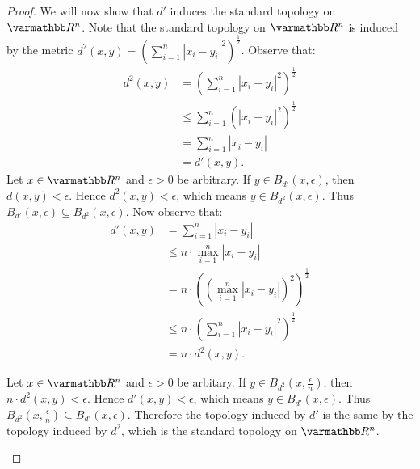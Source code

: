 \documentclass[12pt,twoside,openany]{memoir}
\begin{document}
{\begin{proof}
        We will now show that $d'$ induces the standard topology on $\bfR^n$. Note that the standard topology on $\bfR^n$ is induced by the metric $d^2(x,y) = \left(\sum_{i = 1}^n |x_i - y_i|^2\right)^\frac{1}{2}$. Observe that:
            \begin{equation*}
            \begin{split}
                d^2(x,y) 
                & = \left(\sum_{i = 1}^n |x_i - y_i|^2\right)^\frac{1}{2} \\
                & \leq \sum_{i = 1}^n \left( |x_i - y_i|^2 \right)^\frac{1}{2} \\
                & = \sum_{i = 1}^n |x_i - y_i| \\
                & = d'(x,y).
            \end{split}
            \end{equation*}
        Let $x \in \bfR^n$ and $\epsilon > 0$ be arbitrary. If $y \in B_{d'}(x,\epsilon)$, then $d(x,y) < \epsilon$. Hence $d^2(x,y) < \epsilon$, which means $y \in B_{d^2}(x,\epsilon)$. Thus $B_{d'}(x,\epsilon) \subseteq B_{d^2}(x,\epsilon)$. Now observe that:
            \begin{equation*}
            \begin{split}
                d'(x,y) 
                & = \sum_{i = 1}^n |x_i - y_i| \\
                & \leq n \cdot \max_{i = 1}^n |x_i - y_i| \\
                & = n \cdot \left( (\max_{i = 1}^n |x_i - y_i|)^2 \right)^\frac{1}{2} \\
                & \leq n \cdot \left( \sum_{i = 1}^n |x_i - y_i|^2  \right)^\frac{1}{2} \\
                & = n \cdot d^2(x,y).
            \end{split}
            \end{equation*}

        Let $x \in \bfR^n$ and $\epsilon > 0$ be arbitary. If $y \in B_{d^2}(x,\frac{\epsilon}{n})$, then $n \cdot d^2(x,y) < \epsilon$. Hence $d'(x,y) < \epsilon$, which means $y \in B_{d'}(x,\epsilon)$. Thus $B_{d^2}(x,\frac{\epsilon}{n}) \subseteq B_{d'}(x,\epsilon)$. Therefore the topology induced by $d'$ is the same by the topology induced by $d^2$, which is the standard topology on $\bfR^n$.
            \begin{center}

\end{center}
\end{proof}}
\end{document}
